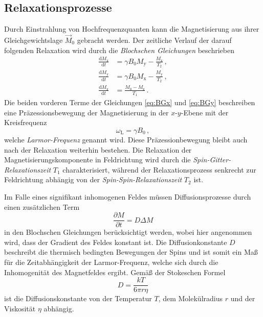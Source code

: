 \subsection{Relaxationsprozesse}
Durch Einstrahlung von Hochfrequenzquanten kann die Magnetisierung aus ihrer Gleichgewichtslage $\vec{M}_0$ gebracht werden.
Der zeitliche Verlauf der darauf folgenden Relaxation wird durch die \textit{Blochschen Gleichungen} beschrieben
\begin{align}
    \frac{\mathrm{d}M_\text{x}}{\mathrm{d}t}&=\gamma B_0M_\text{y}-\frac{M_\text{x}}{T_2}\, , \label{eq:BGx} \\
    \frac{\mathrm{d}M_\text{y}}{\mathrm{d}t}&=\gamma B_0 M_\text{x} - \frac{M_\text{y}}{T_2}\, , \label{eq:BGy} \\
    \frac{\mathrm{d}M_\text{z}}{\mathrm{d}t}&=\frac{M_0-M_\text{z}}{T_1}\, . \label{eq:BGz}
\end{align}
Die beiden vorderen Terme der Gleichungen \eqref{eq:BGx} und \eqref{eq:BGy} beschreiben eine Präzessionsbewegung der Magnetisierung in der $x$-$y$-Ebene mit der Kreisfrequenz
\begin{equation}
    \omega_\text{L}=\gamma B_0\, ,
\end{equation}
welche \textit{Larmor-Frequenz} genannt wird.
Diese Präzessionbewegung bleibt auch nach der Relaxation weiterhin bestehen.
Die Relaxation der Magnetisierungskomponente in Feldrichtung wird durch die \textit{Spin-Gitter-Relaxationszeit} $T_1$ charakterisiert, während der Relaxationsprozess senkrecht zur Feldrichtung abhängig von der \textit{Spin-Spin-Relaxationszeit} $T_2$ ist.

Im Falle eines signifikant inhomogenen Feldes müssen Diffusionsprozesse durch einen zusätzlichen Term
\begin{equation}
    \frac{\partial M}{\partial t} = D \Delta M
\end{equation}
in den Blochschen Gleichungen berücksichtigt werden, wobei hier angenommen wird, dass der Gradient des Feldes konstant ist.
Die Diffusionkonstante $D$ beschreibt die thermisch bedingten Bewegungen der Spins und ist somit ein Maß für die Zeitabhängigkeit der Larmor-Frequenz, welche sich durch die Inhomogenität des Magnetfeldes ergibt.
Gemäß der Stokeschen Formel
\begin{equation}
    D=\frac{kT}{6\pi r \eta}
\end{equation}
ist die Diffusionskonstante von der Temperatur $T$, dem Molekülradius $r$ und der Viskosität $\eta$ abhängig.

